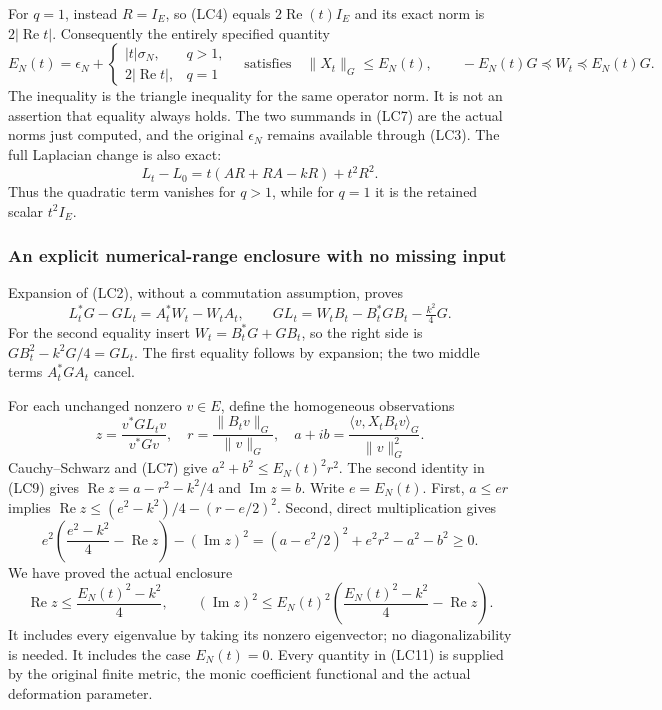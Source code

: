 For \(q=1\), instead \(R=I_E\), so (LC4) equals
\(2\operatorname{Re}(t)I_E\) and its exact norm is
\(2|\operatorname{Re}t|\). Consequently the entirely specified
quantity
\[
 E_N(t)=\epsilon_N+
 \begin{cases}|t|\sigma_N,&q>1,\\
               2|\operatorname{Re}t|,&q=1
 \end{cases}
 \quad\text{satisfies}\quad
 \|X_t\|_G\le E_N(t),\qquad
 -E_N(t)G\preceq W_t\preceq E_N(t)G.
 \tag{LC7}
\]
The inequality is the triangle inequality for the same operator
norm. It is not an assertion that equality always holds. The two
summands in (LC7) are the actual norms just computed, and the
original \(\epsilon_N\) remains available through (LC3).
The full Laplacian change is also exact:
\[
 L_t-L_0=t(AR+RA-kR)+t^2R^2.
 \tag{LC8}
\]
Thus the quadratic term vanishes for \(q>1\), while for \(q=1\)
it is the retained scalar \(t^2I_E\).

\subsubsection{An explicit numerical-range enclosure with no missing input}

Expansion of (LC2), without a commutation assumption, proves
\[
 L_t^*G-GL_t=A_t^*W_t-W_tA_t,\qquad
 GL_t=W_tB_t-B_t^*GB_t-\tfrac{k^2}{4}G.
 \tag{LC9}
\]
For the second equality insert
\(W_t=B_t^*G+GB_t\), so the right side is
\(GB_t^2-k^2G/4=GL_t\). The first equality follows by expansion;
the two middle terms \(A_t^*GA_t\) cancel.

For each unchanged nonzero \(v\in E\), define the homogeneous
observations
\[
 z=\frac{v^*GL_tv}{v^*Gv},\quad
 r=\frac{\|B_tv\|_G}{\|v\|_G},\quad
 a+ib=\frac{\langle v,X_tB_tv\rangle_G}{\|v\|_G^2}.
 \tag{LC10}
\]
Cauchy--Schwarz and (LC7) give
\(a^2+b^2\le E_N(t)^2r^2\). The second identity in (LC9) gives
\(\operatorname{Re}z=a-r^2-k^2/4\) and
\(\operatorname{Im}z=b\). Write \(e=E_N(t)\). First,
\(a\le er\) implies
\(\operatorname{Re}z\le(e^2-k^2)/4-(r-e/2)^2\).
Second, direct multiplication gives
\[
 e^2\left(\frac{e^2-k^2}{4}-\operatorname{Re}z\right)
    -(\operatorname{Im}z)^2
   =(a-e^2/2)^2+e^2r^2-a^2-b^2\ge0.
\]
We have proved the actual enclosure
\[
 \boxed{\operatorname{Re}z\le\frac{E_N(t)^2-k^2}{4},\qquad
 (\operatorname{Im}z)^2\le E_N(t)^2
       \left(\frac{E_N(t)^2-k^2}{4}-\operatorname{Re}z\right).}
 \tag{LC11}
\]
It includes every eigenvalue by taking its nonzero eigenvector;
no diagonalizability is needed. It includes the case \(E_N(t)=0\).
Every quantity in (LC11) is supplied by the original finite metric,
the monic coefficient functional and the actual deformation parameter.

